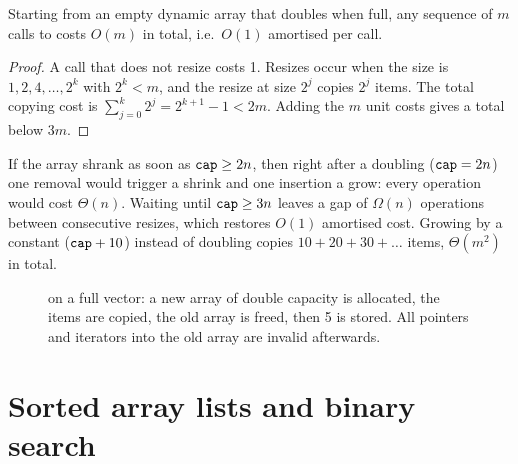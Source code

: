 \begin{theorem}\label{thm:amortised}
Starting from an empty dynamic array that doubles when full, any sequence of $m$ calls to
 costs $O(m)$ in total, i.e.\ $O(1)$ amortised per call.
\end{theorem}
\begin{proof}
A call that does not resize costs 1. Resizes occur when the size is $1,2,4,\dots,2^k$
with $2^k<m$, and the resize at size $2^j$ copies $2^j$ items. The total copying cost is
$\sum_{j=0}^{k}2^j=2^{k+1}-1<2m$. Adding the $m$ unit costs gives a total below $3m$.
\end{proof}

\begin{remark}
If the array shrank as soon as $\texttt{cap}\ge2n$, then right after a doubling
($\texttt{cap}=2n$) one removal would trigger a shrink and one insertion a grow: every
operation would cost $\Theta(n)$. Waiting until $\texttt{cap}\ge3n$ leaves a gap of
$\Omega(n)$ operations between consecutive resizes, which restores $O(1)$ amortised
cost. Growing by a constant ($\texttt{cap}+10$) instead of doubling copies
$10+20+30+\dots$ items, $\Theta(m^2)$ in total.
\end{remark}

\begin{figure}[ht]\centering
{}
\caption{ on a full vector: a new array of double capacity is allocated,
the items are copied, the old array is freed, then 5 is stored. All pointers and
iterators into the old array are invalid afterwards.}
\end{figure}

\section{Sorted array lists and binary search}\label{sec:bsearch}

